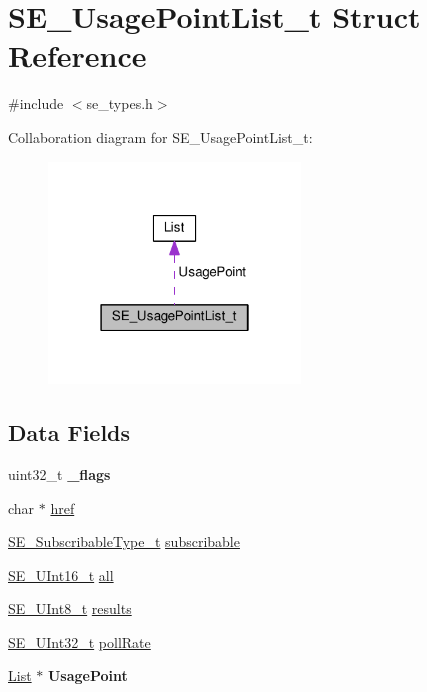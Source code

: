 \hypertarget{structSE__UsagePointList__t}{}\section{S\+E\+\_\+\+Usage\+Point\+List\+\_\+t Struct Reference}
\label{structSE__UsagePointList__t}


{\ttfamily \#include $<$se\+\_\+types.\+h$>$}



Collaboration diagram for S\+E\+\_\+\+Usage\+Point\+List\+\_\+t\+:\nopagebreak
\begin{figure}[H]
\begin{center}
\leavevmode
\includegraphics[width=190pt]{structSE__UsagePointList__t__coll__graph}
\end{center}
\end{figure}
\subsection*{Data Fields}
\begin{DoxyCompactItemize}
\item 
uint32\+\_\+t {\bfseries \+\_\+flags}
\item 
char $\ast$ \hyperlink{group__UsagePointList_ga50a5a203dfb3fa45bd6f2aa6c8969789}{href}
\item 
\hyperlink{group__SubscribableType_ga5c41f553d369710ed34619266bf2551e}{S\+E\+\_\+\+Subscribable\+Type\+\_\+t} \hyperlink{group__UsagePointList_ga801cb7a2df80a375d5bd610359add3a9}{subscribable}
\item 
\hyperlink{group__UInt16_gac68d541f189538bfd30cfaa712d20d29}{S\+E\+\_\+\+U\+Int16\+\_\+t} \hyperlink{group__UsagePointList_ga91f4643b1bfe0a5f0933213245406464}{all}
\item 
\hyperlink{group__UInt8_gaf7c365a1acfe204e3a67c16ed44572f5}{S\+E\+\_\+\+U\+Int8\+\_\+t} \hyperlink{group__UsagePointList_gaa6b306a7e5ad0fdae577e81dc496c2e3}{results}
\item 
\hyperlink{group__UInt32_ga70bd4ecda3c0c85d20779d685a270cdb}{S\+E\+\_\+\+U\+Int32\+\_\+t} \hyperlink{group__UsagePointList_ga7f423f1fa17d9cadd34cae85acce3484}{poll\+Rate}
\item 
\hyperlink{structList}{List} $\ast$ {\bfseries Usage\+Point}
\end{DoxyCompactItemize}


